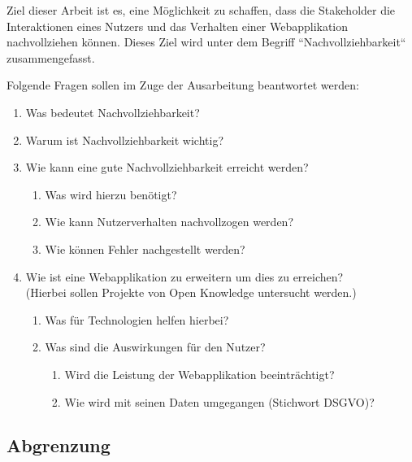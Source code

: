 
Ziel dieser Arbeit ist es, eine Möglichkeit zu schaffen, dass die Stakeholder die Interaktionen eines Nutzers und das Verhalten einer Webapplikation nachvollziehen können. Dieses Ziel wird unter dem Begriff ``Nachvollziehbarkeit`` zusammengefasst.

Folgende Fragen sollen im Zuge der Ausarbeitung beantwortet werden:


\begin{enumerate}
	\item Was bedeutet Nachvollziehbarkeit?
	\item Warum ist Nachvollziehbarkeit wichtig?
	\item Wie kann eine gute Nachvollziehbarkeit erreicht werden?
	\begin{enumerate}
		\item Was wird hierzu benötigt?
		\item Wie kann Nutzerverhalten nachvollzogen werden?
		\item Wie können Fehler nachgestellt werden?
	\end{enumerate}
	\item Wie ist eine Webapplikation zu erweitern um dies zu erreichen? \\ (Hierbei sollen Projekte von Open Knowledge untersucht werden.)
	\begin{enumerate}
		\item Was für Technologien helfen hierbei?
		\item Was sind die Auswirkungen für den Nutzer?
		\begin{enumerate}
			\item Wird die Leistung der Webapplikation beeinträchtigt?
			\item Wie wird mit seinen Daten umgegangen (Stichwort DSGVO)?
		\end{enumerate}
	\end{enumerate}
\end{enumerate}


\subsection{Abgrenzung}


